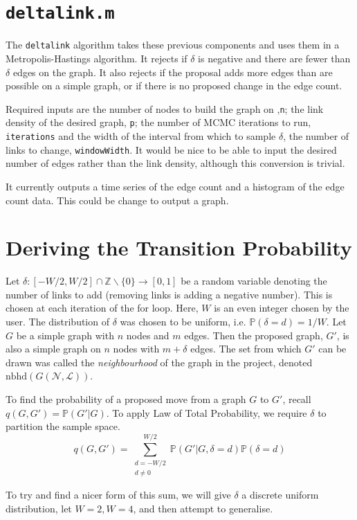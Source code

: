 \documentclass[12pt,a4paper]{article}
\newcommand{\N}{\mathcal{N}}
\theoremstyle{definition}
\renewcommand{\P}{\mathbb{P}}
\begin{document}
\section{\texttt{deltalink.m}}
The \texttt{deltalink} algorithm takes these previous components and uses them in a Metropolis-Hastings algorithm. It rejects if \(\delta\) is negative and there are fewer than \(\delta\) edges on the graph. It also rejects if the proposal adds more edges than are possible on a simple graph, or if there is no proposed change in the edge count.

Required inputs are the number of nodes to build the graph on ,\texttt{n}; the link density of the desired graph, \texttt{p}; the number of MCMC iterations to run, \texttt{iterations} and the width of the interval from which to sample \(\delta\), the number of links to change, \texttt{windowWidth}. It would be nice to be able to input the desired number of edges rather than the link density, although this conversion is trivial. 

It currently outputs a time series of the edge count and a histogram of the edge count data. This could be change to output a graph.

\section{Deriving the Transition Probability}
Let \(\delta:[-W/2,W/2]\cap\mathbb{Z}\backslash\{0\} \to [0,1] \) be a random variable denoting the number of links to add (removing links is adding a negative number). This is chosen at each iteration of the for loop. Here, \(W\) is an even integer chosen by the user. The distribution of \(\delta\) was chosen to be uniform, i.e. \(\P(\delta=d)=1/W\). Let \(G\) be a simple graph with \(n\) nodes and \(m\) edges. Then the proposed graph, \(G'\), is also a simple graph on \(n\) nodes with \(m+\delta\) edges. The set from which \(G'\) can be drawn was called the \textit{neighbourhood} of the graph in the project, denoted \(\textrm{nbhd}(G(\N,\mathcal{L}))\).
 
To find the probability of a proposed move from a graph \(G\) to \(G'\), recall \(q(G,G')=\P(G'|G)\). To apply Law of Total Probability, we require \(\delta\) to partition the sample space.
\[q(G,G')=\sum_{\substack{d=-W/2\\d \neq 0}}^{W/2}\P(G'|G,\delta=d)\P(\delta=d)\]

To try and find a nicer form of this sum, we will give \(\delta\) a discrete uniform distribution, let \(W=2,W=4\), and then attempt to generalise.
\end{document}
